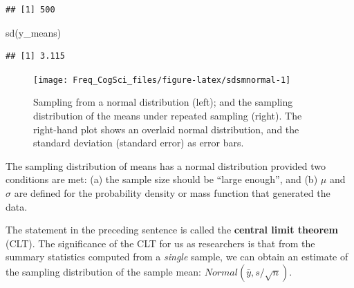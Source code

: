 \documentclass[
  12pt,
]{krantz}
\newenvironment{Shaded}{\begin{snugshade}}{\end{snugshade}}
\newcommand{\FunctionTok}[1]{\textcolor[rgb]{0.00,0.00,0.00}{#1}}
\newcommand{\NormalTok}[1]{#1}
\theoremstyle{definition}
\theoremstyle{definition}
\theoremstyle{definition}
\theoremstyle{definition}
\theoremstyle{remark}
\begin{document}
\begin{verbatim}
## [1] 500
\end{verbatim}

\begin{Shaded}
\begin{Highlighting}[]
\FunctionTok{sd}\NormalTok{(y\_means)}
\end{Highlighting}
\end{Shaded}

\begin{verbatim}
## [1] 3.115
\end{verbatim}

\begin{figure}
\texttt{[image: Freq\_CogSci\_files/figure-latex/sdsmnormal-1]} \caption{Sampling from a normal distribution (left); and the sampling distribution of the means under repeated sampling (right). The right-hand plot shows an overlaid normal distribution, and the standard deviation (standard error) as error bars.}\label{fig:sdsmnormal}
\end{figure}

The sampling distribution of means has a normal distribution provided two conditions are met: (a) the sample size should be ``large enough'', and (b) \(\mu\) and \(\sigma\) are defined for the probability density or mass function that generated the data.

The statement in the preceding sentence is called the \textbf{central limit theorem} (CLT). The significance of the CLT for us as researchers is that from the summary statistics computed from a \emph{single} sample, we can obtain an estimate of the sampling distribution of the sample mean: \(Normal(\bar{y},s/\sqrt{n})\).
\end{document}
